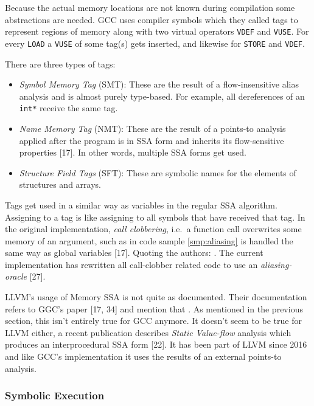 \documentclass[]{article}
\providecommand{\tightlist}{%
  \setlength{\itemsep}{0pt}\setlength{\parskip}{0pt}}
\begin{document}
Because the actual memory locations are not known during compilation
some abstractions are needed. GCC uses compiler symbols which they
called tags to represent regions of memory along with two virtual
operators \texttt{VDEF} and \texttt{VUSE}. For every \texttt{LOAD} a
\texttt{VUSE} of some tag(s) gets inserted, and likewise for
\texttt{STORE} and \texttt{VDEF}.

There are three types of tags:

\begin{itemize}
\tightlist
\item
  \emph{Symbol Memory Tag} (SMT): These are the result of a
  flow-insensitive alias analysis and is almost purely type-based. For
  example, all dereferences of an \texttt{int*} receive the same tag.
\item
  \emph{Name Memory Tag} (NMT): These are the result of a points-to
  analysis applied after the program is in SSA form and inherits its
  flow-sensitive properties {[}17{]}. In other words, multiple SSA forms
  get used.
\item
  \emph{Structure Field Tags} (SFT): These are symbolic names for the
  elements of structures and arrays.
\end{itemize}

Tags get used in a similar way as variables in the regular SSA
algorithm. Assigning to a tag is like assigning to all symbols that have
received that tag. In the original implementation, \emph{call
clobbering}, i.e.~a function call overwrites some memory of an argument,
such as in code sample \ref{smp:aliasing} is handled the same way as
global variables {[}17{]}. Quoting the authors:
. The
current implementation has rewritten all call-clobber related code to
use an \emph{aliasing-oracle} {[}27{]}.

LLVM's usage of Memory SSA is not quite as documented. Their
documentation refers to GGC's paper {[}17, 34{]} and mention that
. As mentioned in
the previous section, this isn't entirely true for GCC anymore. It
doesn't seem to be true for LLVM either, a recent publication describes
\emph{Static Value-flow} analysis which produces an interprocedural SSA
form {[}22{]}. It has been part of LLVM since 2016 and like GCC's
implementation it uses the results of an external points-to analysis.

\subsubsection{Symbolic Execution}\label{symbolic-execution}
\end{document}
